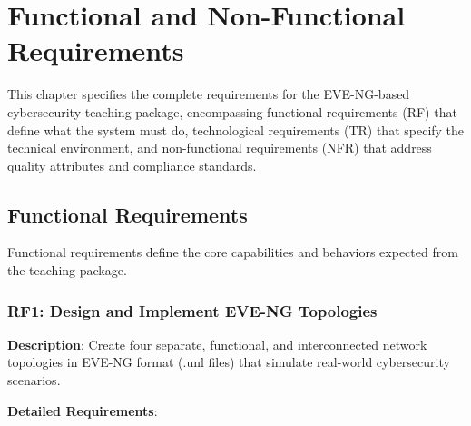 
\chapter{Functional and Non-Functional Requirements}


This chapter specifies the complete requirements for the EVE-NG-based~\cite{eve_ng} cybersecurity teaching package, encompassing functional requirements (RF) that define what the system must do, technological requirements (TR) that specify the technical environment, and non-functional requirements (NFR) that address quality attributes and compliance standards.

\section{Functional Requirements}

Functional requirements define the core capabilities and behaviors expected from the teaching package.

\subsection{RF1: Design and Implement EVE-NG Topologies}

\textbf{Description}: Create four separate, functional, and interconnected network topologies in EVE-NG format (.unl files) that simulate real-world cybersecurity scenarios.

\textbf{Detailed Requirements}:

